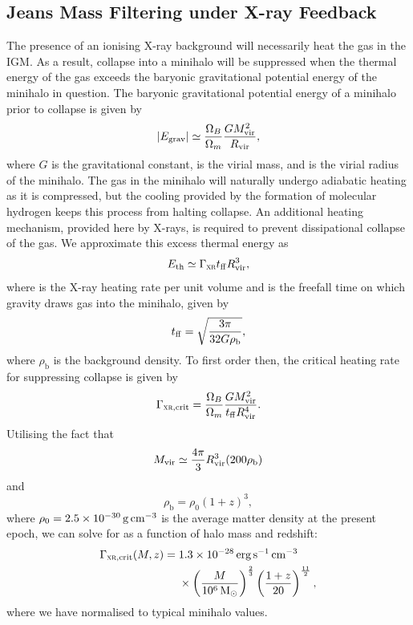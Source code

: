 \documentclass[../thesis.tex]{subfiles}
\begin{document}
\subsection{Jeans Mass Filtering under X-ray Feedback}
\label{filtering}
The presence of an ionising X-ray background will necessarily heat the
gas in the IGM.  As a result, collapse into a minihalo will be
suppressed when the thermal energy of the gas exceeds the
baryonic gravitational potential energy of the minihalo in question.  The
baryonic gravitational potential energy of a minihalo prior to collapse is given by
\begin{equation}
  \left|{E}_{\mathrm{grav}}\right| \simeq \frac{\Omega_B}{\Omega_m} \frac{G {M}_{\mathrm{vir}}^2}{{R}_{\mathrm{vir}}},
\end{equation}
where $G$ is the gravitational constant, \mvir is the virial mass, and \rvir is the virial radius of the minihalo.
The gas in the minihalo will naturally undergo adiabatic heating as it
is compressed, but the cooling provided by the formation of molecular hydrogen keeps this process from halting collapse.  An additional heating
mechanism, provided here by X-rays, is required to prevent dissipational collapse of the gas.  We approximate this
excess thermal energy \etherm as
\begin{equation}
  {E}_{\mathrm{th}} \simeq \Gamma_{\textsc{xr}} {t}_{\mathrm{ff}} {R}_{\mathrm{vir}}^3,
\end{equation}
where \gxr is the X-ray heating rate per unit volume and \tff is the freefall
time on which gravity draws gas into the minihalo, given by
\begin{equation}
  {t}_{\mathrm{ff}} = \sqrt{\frac{3\pi}{32 G \rho_{\mathrm b}}},
\end{equation}
where $\rho_{\mathrm b}$ is the background density. To first order then, the critical heating rate \gcrit for suppressing collapse  is  given by
\begin{equation}
  \Gamma_{\textsc{xr}, \mathrm{crit}} = \frac{\Omega_B}{\Omega_m} \frac{G {M}_{\mathrm{vir}}^2}{{t}_{\mathrm{ff}} {R}_{\mathrm{vir}}^4}.
\end{equation}
Utilising the fact that 
\begin{equation}
  {M}_{\mathrm{vir}} \simeq \frac{4\pi}{3}{R}_{\mathrm{vir}}^3 (200 \rho_{\mathrm b})
\end{equation} 
and
\begin{equation}
  \rho_{\mathrm b} = \rho_0 (1+z)^3,
\end{equation}
where $\rho_0 = 2.5\times10^{-30}\,{\mathrm g}\,\mathrm{cm}^{-3}$ is the average matter density at the present epoch, we can solve for \gcrit as a function of halo mass and redshift:
\begin{equation}
  \begin{split}
    \Gamma_{\textsc{xr}, \mathrm{crit}}(M,z) = \; & 1.3\times10^{-28} \,\mathrm{erg}\,\mathrm{s}^{-1}\,\mathrm{cm}^{-3} \\  
    &\times \left(\frac{M}{10^6\,\mathrm{M}_{\odot}}\right)^{\frac{2}{3}} 
    \left(\frac{1+z}{20}\right)^{\frac{11}{2}},
  \end{split}
\end{equation}
where we have normalised to typical minihalo values.  
\end{document}
